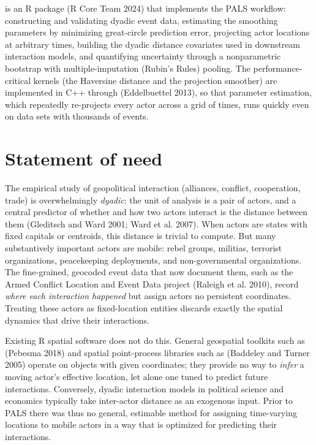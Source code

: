 \documentclass[10pt,a4paper,onecolumn]{article}
\let\textttOrig=\texttt
\def\texttt#1{\expandafter\textttOrig{\seqsplit{#1}}}
\begin{document}
\texttt{palsr} is an R package (R Core Team 2024) that implements the
PALS workflow: constructing and validating dyadic event data, estimating
the smoothing parameters by minimizing great-circle prediction error,
projecting actor locations at arbitrary times, building the dyadic distance
covariates used in downstream interaction models, and quantifying
uncertainty through a nonparametric bootstrap with multiple-imputation
(Rubin's Rules) pooling. The performance-critical kernels (the Haversine
distance and the projection smoother) are implemented in C++ through
\texttt{Rcpp} (Eddelbuettel 2013), so that parameter estimation, which
repeatedly re-projects every actor across a grid of times, runs quickly
even on data sets with thousands of events.

\section{Statement of need}\label{statement-of-need}

The empirical study of geopolitical interaction (alliances, conflict,
cooperation, trade) is overwhelmingly \emph{dyadic}: the unit of analysis
is a pair of actors, and a central predictor of whether and how two actors
interact is the distance between them (Gleditsch and Ward 2001; Ward et al.
2007). When actors are states with fixed capitals or centroids, this
distance is trivial to compute. But many substantively important actors are
mobile: rebel groups, militias, terrorist organizations, peacekeeping
deployments, and non-governmental organizations. The fine-grained, geocoded event data that
now document them, such as the Armed Conflict Location and Event Data
project (Raleigh et al. 2010), record \emph{where each interaction
happened} but assign actors no persistent coordinates. Treating these
actors as fixed-location entities discards exactly the spatial dynamics
that drive their interactions.

Existing R spatial software does not do this. General geospatial toolkits
such as \texttt{sf} (Pebesma 2018) and spatial point-process libraries such
as \texttt{spatstat} (Baddeley and Turner 2005) operate on objects with
given coordinates; they provide no way to \emph{infer} a moving actor's
effective location,
let alone one tuned to predict future interactions. Conversely, dyadic
interaction models in political science and economics typically take
inter-actor distance as an exogenous input. Prior to PALS there was thus
no general, estimable method for assigning time-varying locations to
mobile actors in a way that is optimized for predicting their
interactions.
\end{document}
